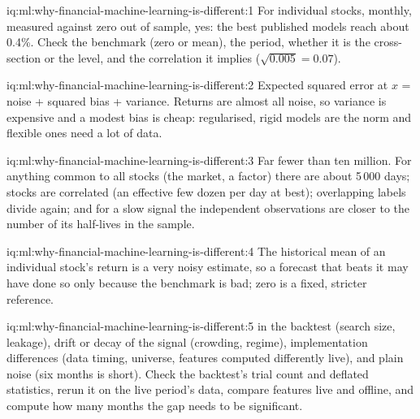 \begin{solution}{iq:ml:why-financial-machine-learning-is-different:1}
For individual stocks, monthly, measured against zero out of sample, yes: the best published models reach about
0.4\%. Check the benchmark (zero or mean), the period, whether it is the cross-section or the level, and the
correlation it implies ($\sqrt{0.005} = 0.07$).
\end{solution}

\begin{solution}{iq:ml:why-financial-machine-learning-is-different:2}
Expected squared error at $x$ = noise + squared bias + variance. Returns are almost all noise, so variance is expensive
and a modest bias is cheap: regularised, rigid models are the norm and flexible ones need a lot of data.
\end{solution}

\begin{solution}{iq:ml:why-financial-machine-learning-is-different:3}
Far fewer than ten million. For anything common to all stocks (the market, a factor) there are about 5\,000 days; stocks
are correlated (an effective few dozen per day at best); overlapping labels divide again; and for a slow signal the
independent observations are closer to the number of its half-lives in the sample.
\end{solution}

\begin{solution}{iq:ml:why-financial-machine-learning-is-different:4}
The historical mean of an individual stock's return is a very noisy estimate, so a forecast that beats it may have done
so only because the benchmark is bad; zero is a fixed, stricter reference.
\end{solution}

\begin{solution}{iq:ml:why-financial-machine-learning-is-different:5}
 in the backtest (search size, leakage), drift or decay of the signal (crowding, regime), implementation
differences (data timing, universe, features computed differently live), and plain noise (six months is short). Check
the backtest's trial count and deflated statistics, rerun it on the live period's data, compare features live and
offline, and compute how many months the gap needs to be significant.
\end{solution}

